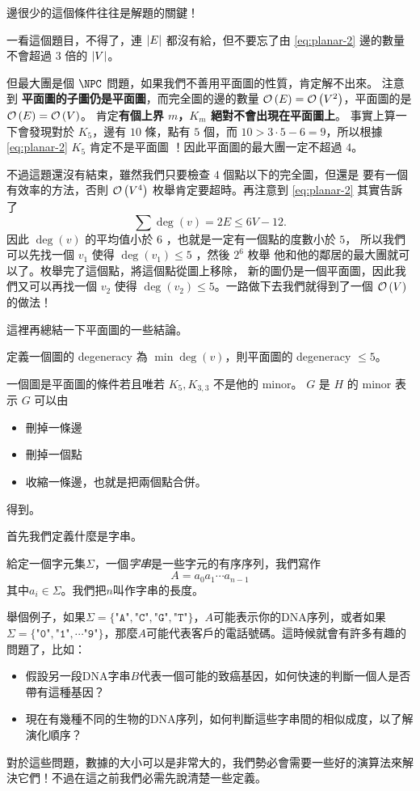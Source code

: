 \documentclass[a4paper,12pt]{book}
\begin{document}
邊很少的這個條件往往是解題的關鍵！

一看這個題目，不得了，連 $\lvert E \rvert$ 都沒有給，但不要忘了由 \eqref{eq:planar-2}
邊的數量不會超過 $3$ 倍的 $\lvert V \rvert$。 

但最大團是個 $\NPC$ 問題，如果我們不善用平面圖的性質，肯定解不出來。
注意到 {\bf 平面圖的子圖仍是平面圖}，而完全圖的邊的數量 
$\operatorname{\mathcal{O}}\left(E\right) = \operatorname{\mathcal{O}}\left(V^2\right)$，平面圖的是 $\operatorname{\mathcal{O}}\left(E\right) = \operatorname{\mathcal{O}}\left(V\right)$。
肯定{\bf 有個上界 $m$，$K_m$ 絕對不會出現在平面圖上}。
事實上算一下會發現對於 $K_5$，邊有 $10$ 條，點有 $5$ 個，而
$10 > 3 \cdot 5 - 6 = 9$，所以根據 \eqref{eq:planar-2} $K_5$ 肯定不是平面圖
！因此平面圖的最大團一定不超過 $4$。

不過這題還沒有結束，雖然我們只要檢查 $4$ 個點以下的完全圖，但還是
要有一個有效率的方法，否則 $\operatorname{\mathcal{O}}\left(V^4\right)$ 枚舉肯定要超時。再注意到
\eqref{eq:planar-2} 其實告訴了
\[ \sum \deg(v) = 2E \leq 6V - 12.\]
因此 $\deg(v)$ 的平均值小於 $6$ ，也就是一定有一個點的度數小於 $5$，
所以我們可以先找一個 $v_1$ 使得 $\deg(v_1) \leq 5$ ，然後 $2^6$ 枚舉
他和他的鄰居的最大團就可以了。枚舉完了這個點，將這個點從圖上移除，
新的圖仍是一個平面圖，因此我們又可以再找一個 $v_2$ 使得
$\deg(v_2) \leq 5$。一路做下去我們就得到了一個 $\operatorname{\mathcal{O}}\left(V\right)$ 的做法！

這裡再總結一下平面圖的一些結論。

\begin{theorem}[定理]
  定義一個圖的 degeneracy 為 $\min \deg(v)$，則平面圖的 degeneracy $\leq 5$。
\end{theorem}

\begin{theorem}[定理]
  一個圖是平面圖的條件若且唯若 $K_5, K_{3, 3}$ 不是他的 minor。
  $G$ 是 $H$ 的 minor 表示 $G$ 可以由
  \begin{itemize}
    \item 刪掉一條邊
    \item 刪掉一個點
    \item 收縮一條邊，也就是把兩個點合併。
  \end{itemize}
  得到。
\end{theorem}


首先我們定義什麼是字串。
\begin{theorem}[定義]
  給定一個字元集$\Sigma$，一個\emph{字串}是一些字元的有序序列，我們寫作
  \[ A = a_0 a_1 \cdots a_{n-1} \]
  其中$a_i \in \Sigma$。我們把$n$叫作字串的長度。
\end{theorem}
舉個例子，如果$\Sigma = \{\texttt{"A"}, \texttt{"C"}, \texttt{"G"}, \texttt{"T"}\}$，$A$可能表示你的DNA序列，或者如果$\Sigma = \{\texttt{"0"}, \texttt{"1"}, \cdots \texttt{"9"}\}$，那麼$A$可能代表客戶的電話號碼。這時候就會有許多有趣的問題了，比如：
\begin{itemize}
  \item 假設另一段DNA字串$B$代表一個可能的致癌基因，如何快速的判斷一個人是否帶有這種基因？
  \item 現在有幾種不同的生物的DNA序列，如何判斷這些字串間的相似成度，以了解演化順序？
\end{itemize}
對於這些問題，數據的大小可以是非常大的，我們勢必會需要一些好的演算法來解決它們！不過在這之前我們必需先說清楚一些定義。
\end{document}
